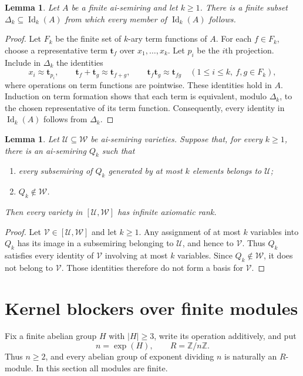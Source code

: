 \documentclass[10pt,a4paper]{amsart}
\newtheorem{lemma}[theorem]{Lemma}
\numberwithin{equation}{section}
\newcommand{\Id}{\operatorname{Id}}
\newcommand{\expon}{\operatorname{exp}}
\newcommand{\Z}{\mathbb{Z}}
\newcommand{\bt}{\mathbf{t}}
\newcommand{\calU}{\mathcal{U}}
\newcommand{\calV}{\mathcal{V}}
\newcommand{\calW}{\mathcal{W}}
\renewcommand{\leq}{\leqslant}
\renewcommand{\geq}{\geqslant}
\begin{document}
\begin{lemma}\label{lem:finitevariable}
Let $A$ be a finite ai-semiring and let $k\geq 1$. There is a finite subset $\Delta_k\subseteq\Id_k(A)$ from which every member of $\Id_k(A)$ follows.
\end{lemma}
\begin{proof}
Let $F_k$ be the finite set of $k$-ary term functions of $A$. For each $f\in F_k$, choose a representative term $\bt_f$ over $x_1,\ldots,x_k$. Let $p_i$ be the $i$th projection. Include in $\Delta_k$ the identities
\[
 x_i\approx\bt_{p_i},\qquad
 \bt_f+\bt_g\approx\bt_{f+g},\qquad
 \bt_f\bt_g\approx\bt_{fg}
 \quad(1\leq i\leq k,\ f,g\in F_k),
\]
where operations on term functions are pointwise. These identities hold in $A$. Induction on term formation shows that each term is equivalent, modulo $\Delta_k$, to the chosen representative of its term function. Consequently, every identity in $\Id_k(A)$ follows from $\Delta_k$.
\end{proof}

\begin{lemma}\label{lem:local}
Let $\calU\subseteq\calW$ be ai-semiring varieties. Suppose that, for every $k\geq 1$, there is an ai-semiring $Q_k$ such that
\begin{enumerate}[label=\textup{(\roman*)},leftmargin=2.4em]
\item every subsemiring of $Q_k$ generated by at most $k$ elements belongs to $\calU$;
\item $Q_k\notin\calW$.
\end{enumerate}
Then every variety in $[\calU,\calW]$ has infinite axiomatic rank.
\end{lemma}
\begin{proof}
Let $\calV\in[\calU,\calW]$ and let $k\geq 1$. Any assignment of at most $k$ variables into $Q_k$ has its image in a subsemiring belonging to $\calU$, and hence to $\calV$. Thus $Q_k$ satisfies every identity of $\calV$ involving at most $k$ variables. Since $Q_k\notin\calW$, it does not belong to $\calV$. Those identities therefore do not form a basis for $\calV$.
\end{proof}

\section{Kernel blockers over finite modules}\label{sec:modules}
Fix a finite abelian group $H$ with $|H|\geq 3$, write its operation additively, and put
\[
 n=\expon(H),\qquad R=\Z/n\Z.
\]
Thus $n\geq 2$, and every abelian group of exponent dividing $n$ is naturally an $R$-module. In this section all modules are finite.
\end{document}
